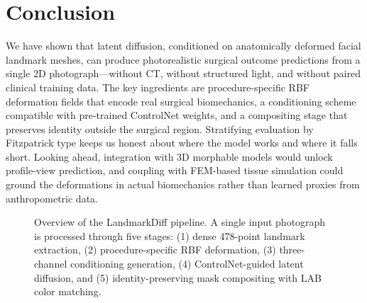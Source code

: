 \documentclass[runningheads]{llncs}
\newcommand{\method}{LandmarkDiff}
\begin{document}
\section{Conclusion}
\label{sec:conclusion}

We have shown that latent diffusion, conditioned on anatomically
deformed facial landmark meshes, can produce photorealistic surgical
outcome predictions from a single 2D photograph---without CT, without
structured light, and without paired clinical training data.  The key
ingredients are procedure-specific RBF deformation fields that encode
real surgical biomechanics, a conditioning scheme compatible with
pre-trained ControlNet weights, and a compositing stage that preserves
identity outside the surgical region.  Stratifying evaluation by
Fitzpatrick type keeps us honest about where the model works and where
it falls short.  Looking ahead, integration with 3D morphable models
would unlock profile-view prediction, and coupling with FEM-based
tissue simulation could ground the deformations in actual biomechanics
rather than learned proxies from anthropometric data.


\begin{figure}[t]
\centering
\caption{Overview of the \method{} pipeline.  A single input photograph
is processed through five stages: (1) dense 478-point landmark extraction,
(2) procedure-specific RBF deformation, (3) three-channel conditioning
generation, (4) ControlNet-guided latent diffusion, and (5)
identity-preserving mask compositing with LAB color matching.}
\label{fig:architecture}
\end{figure}
\end{document}
